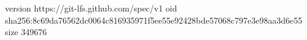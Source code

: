 version https://git-lfs.github.com/spec/v1
oid sha256:8c69da76562dc0064c816935971f5ee55e92428bde57068c797e3e98aa3d6e55
size 349676
